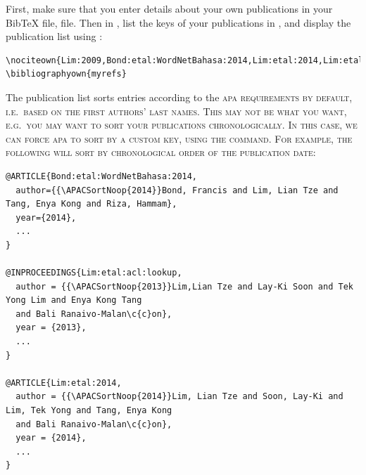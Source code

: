 \documentclass[a4paper,nofonts,raggedright,titlepage,openany]{tufte-book}
\newcommand{\textls}[2][5]{%
    \begingroup\addfontfeatures{LetterSpace=#1}#2\endgroup
  }
\renewcommand{\smallcapsspacing}[1]{\textls[10]{#1}}
\renewcommand{\smallcaps}[1]{\smallcapsspacing{\scshape\MakeTextLowercase{#1}}}
\begin{document}
First, make sure that you enter details about your own publications in your Bib\TeX{} file,  file.
Then in , list the keys of your publications in \texttt{}, and display the publication list using \texttt{\bibliographyown}:

\begin{fullwidth}
\begin{verbatim}
\nociteown{Lim:2009,Bond:etal:WordNetBahasa:2014,Lim:etal:2014,Lim:etal:acl:lookup}
\bibliographyown{myrefs}
\end{verbatim}
\end{fullwidth}

The publication list sorts entries according to the \smallcaps{APA} requirements by default, i.e.~based on the first authors' last names. This may not be what you want, e.g.~you may want to sort your publications chronologically. In this case, we can force \smallcaps{APA} to sort by a custom key, using the \texttt{\APACSortNoop} command. For example, the following will sort by chronological order of the publication date:


\begin{verbatim}
@ARTICLE{Bond:etal:WordNetBahasa:2014,
  author={{\APACSortNoop{2014}}Bond, Francis and Lim, Lian Tze and Tang, Enya Kong and Riza, Hammam},
  year={2014},
  ...
}

@INPROCEEDINGS{Lim:etal:acl:lookup,
  author = {{\APACSortNoop{2013}}Lim,Lian Tze and Lay-Ki Soon and Tek Yong Lim and Enya Kong Tang
  and Bali Ranaivo-Malan\c{c}on},
  year = {2013},
  ...
}

@ARTICLE{Lim:etal:2014,
  author = {{\APACSortNoop{2014}}Lim, Lian Tze and Soon, Lay-Ki and Lim, Tek Yong and Tang, Enya Kong
  and Bali Ranaivo-Malan\c{c}on},
  year = {2014},
  ...
}
\end{verbatim}

\nobibliography*

\end{document}
